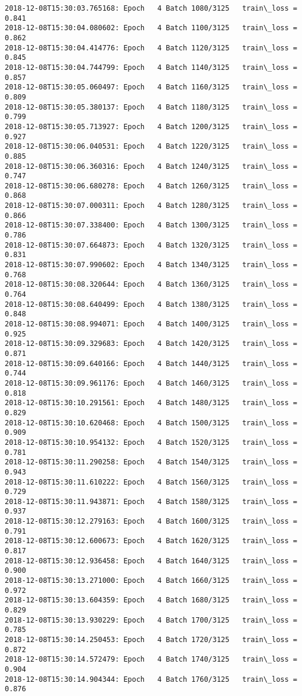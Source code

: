 \documentclass[11pt]{article}
\begin{document}
\begin{Verbatim}[commandchars=\\\{\}]
2018-12-08T15:30:03.765168: Epoch   4 Batch 1080/3125   train\_loss = 0.841
2018-12-08T15:30:04.080602: Epoch   4 Batch 1100/3125   train\_loss = 0.862
2018-12-08T15:30:04.414776: Epoch   4 Batch 1120/3125   train\_loss = 0.845
2018-12-08T15:30:04.744799: Epoch   4 Batch 1140/3125   train\_loss = 0.857
2018-12-08T15:30:05.060497: Epoch   4 Batch 1160/3125   train\_loss = 0.809
2018-12-08T15:30:05.380137: Epoch   4 Batch 1180/3125   train\_loss = 0.799
2018-12-08T15:30:05.713927: Epoch   4 Batch 1200/3125   train\_loss = 0.927
2018-12-08T15:30:06.040531: Epoch   4 Batch 1220/3125   train\_loss = 0.885
2018-12-08T15:30:06.360316: Epoch   4 Batch 1240/3125   train\_loss = 0.747
2018-12-08T15:30:06.680278: Epoch   4 Batch 1260/3125   train\_loss = 0.868
2018-12-08T15:30:07.000311: Epoch   4 Batch 1280/3125   train\_loss = 0.866
2018-12-08T15:30:07.338400: Epoch   4 Batch 1300/3125   train\_loss = 0.786
2018-12-08T15:30:07.664873: Epoch   4 Batch 1320/3125   train\_loss = 0.831
2018-12-08T15:30:07.990602: Epoch   4 Batch 1340/3125   train\_loss = 0.768
2018-12-08T15:30:08.320644: Epoch   4 Batch 1360/3125   train\_loss = 0.764
2018-12-08T15:30:08.640499: Epoch   4 Batch 1380/3125   train\_loss = 0.848
2018-12-08T15:30:08.994071: Epoch   4 Batch 1400/3125   train\_loss = 0.925
2018-12-08T15:30:09.329683: Epoch   4 Batch 1420/3125   train\_loss = 0.871
2018-12-08T15:30:09.640166: Epoch   4 Batch 1440/3125   train\_loss = 0.744
2018-12-08T15:30:09.961176: Epoch   4 Batch 1460/3125   train\_loss = 0.818
2018-12-08T15:30:10.291561: Epoch   4 Batch 1480/3125   train\_loss = 0.829
2018-12-08T15:30:10.620468: Epoch   4 Batch 1500/3125   train\_loss = 0.909
2018-12-08T15:30:10.954132: Epoch   4 Batch 1520/3125   train\_loss = 0.781
2018-12-08T15:30:11.290258: Epoch   4 Batch 1540/3125   train\_loss = 0.943
2018-12-08T15:30:11.610222: Epoch   4 Batch 1560/3125   train\_loss = 0.729
2018-12-08T15:30:11.943871: Epoch   4 Batch 1580/3125   train\_loss = 0.937
2018-12-08T15:30:12.279163: Epoch   4 Batch 1600/3125   train\_loss = 0.791
2018-12-08T15:30:12.600673: Epoch   4 Batch 1620/3125   train\_loss = 0.817
2018-12-08T15:30:12.936458: Epoch   4 Batch 1640/3125   train\_loss = 0.900
2018-12-08T15:30:13.271000: Epoch   4 Batch 1660/3125   train\_loss = 0.972
2018-12-08T15:30:13.604359: Epoch   4 Batch 1680/3125   train\_loss = 0.829
2018-12-08T15:30:13.930229: Epoch   4 Batch 1700/3125   train\_loss = 0.785
2018-12-08T15:30:14.250453: Epoch   4 Batch 1720/3125   train\_loss = 0.872
2018-12-08T15:30:14.572479: Epoch   4 Batch 1740/3125   train\_loss = 0.904
2018-12-08T15:30:14.904344: Epoch   4 Batch 1760/3125   train\_loss = 0.876

\end{Verbatim}
\end{document}
